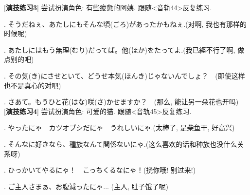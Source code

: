 [\textbf{演技练习3}] 尝试扮演角色: 有些疲惫的阿姨. 跟随<音轨44>反复练习.\par
{}. \mincho そうだねぇ、あたしにもそんな頃(ごろ)があったかもねぇ.\rmfamily (对啊, 我也有那样的时候呢)\par
{}. \mincho あたしにはもう無理(むり)だってば。他(ほか)をたってよ.\rmfamily (我已經不行了啊, 做点别的吧)\par

\clearpage

. \mincho その気(き)にさせといて、どうせ本気(ほんき)じゃないんでしょ？\rmfamily　(即使这样也不是真心的对吧)\par
{}. \mincho さあて。もうひと花(はな)咲(さ)かせますか？\rmfamily　(那么, 能让另一朵花也开吗)\\

[\textbf{演技练习4}] 尝试扮演角色: 可爱的猫. 跟随<音轨45>反复练习.\par
{}. \mincho やったにゃ　カツオブシだにゃ　うれしいにゃ.\rmfamily (太棒了, 是柴鱼干, 好高兴)\par
{}. \mincho そんなに好きなら、種族なんて関係ないにゃ.\rmfamily (这么喜欢的话和种族也没什么关系呀)\par
{}. \mincho ひっかいてやるにゃ！　こっちくるなにゃ！\rmfamily (挠你哦! 别过来!)\par
{}. \mincho ご主人さまぁ、お腹減ったにゃ... \rmfamily (主人, 肚子饿了呢)\\



